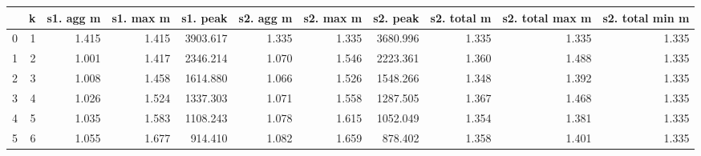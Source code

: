 \begin{tabular}{lrrrrrrrrrr}
\toprule
{} &  k &  s1. agg m &  s1. max m &  s1. peak &  s2. agg m &  s2. max m &  s2. peak &  s2. total m &  s2. total max m &  s2. total min m \\
\midrule
0 &  1 &      1.415 &      1.415 &  3903.617 &      1.335 &      1.335 &  3680.996 &        1.335 &            1.335 &            1.335 \\
1 &  2 &      1.001 &      1.417 &  2346.214 &      1.070 &      1.546 &  2223.361 &        1.360 &            1.488 &            1.335 \\
2 &  3 &      1.008 &      1.458 &  1614.880 &      1.066 &      1.526 &  1548.266 &        1.348 &            1.392 &            1.335 \\
3 &  4 &      1.026 &      1.524 &  1337.303 &      1.071 &      1.558 &  1287.505 &        1.367 &            1.468 &            1.335 \\
4 &  5 &      1.035 &      1.583 &  1108.243 &      1.078 &      1.615 &  1052.049 &        1.354 &            1.381 &            1.335 \\
5 &  6 &      1.055 &      1.677 &   914.410 &      1.082 &      1.659 &   878.402 &        1.358 &            1.401 &            1.335 \\
\bottomrule
\end{tabular}
